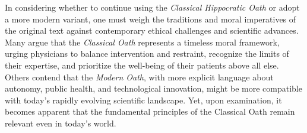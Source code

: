 \documentclass[12pt]{article}
\begin{document}
\bigskip

In considering whether to continue using the \textit{Classical Hippocratic Oath} or adopt a more modern variant, 
one must weigh the traditions and moral imperatives of the original text against contemporary ethical challenges and scientific advances. 
Many argue that the \textit{Classical Oath} represents a timeless moral framework, urging physicians to balance intervention and restraint, 
recognize the limits of their expertise, and prioritize the well-being of their patients above all else. 
Others contend that the \textit{Modern Oath}, with more explicit language about autonomy, public health, and technological innovation, 
might be more compatible with today’s rapidly evolving scientific landscape. 
Yet, upon examination, it becomes apparent that the fundamental principles of the Classical Oath remain relevant even in today's world.

\bigskip
\end{document}
